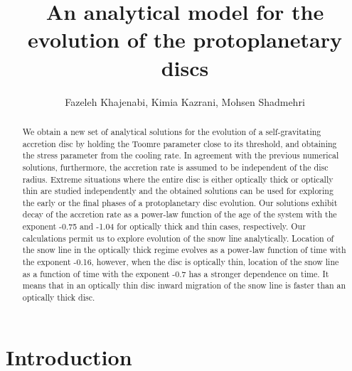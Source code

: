 \documentclass[apj]{emulateapj}
\begin{document}
\title{An analytical model for the evolution of the protoplanetary discs}



\author{Fazeleh Khajenabi, Kimia Kazrani, Mohsen Shadmehri }

 





\begin{abstract}
%
We obtain a new set of analytical solutions for the evolution of a self-gravitating accretion disc by holding  the Toomre parameter  close to its threshold, and obtaining the stress parameter from the cooling rate. In agreement with the previous numerical solutions, furthermore, the accretion rate is assumed to be independent of the disc radius. Extreme situations where the entire disc is either optically thick or optically thin are studied independently and the obtained solutions can be used for exploring the early or the final phases of a protoplanetary disc evolution. Our solutions exhibit decay of the accretion rate as a power-law function of the age of the system with the exponent -0.75 and -1.04 for optically thick and thin cases, respectively.  Our calculations permit us to explore evolution of the snow line analytically. Location of the snow line in the optically thick regime evolves as a  power-law function of time with the exponent -0.16, however, when the disc is optically thin, location of the snow line as a function of time with the exponent -0.7 has a stronger dependence on time. It means that in an optically thin disc inward migration of the snow line is faster than an optically thick disc. 
\end{abstract}











\section{Introduction}
%
%
\end{document}

